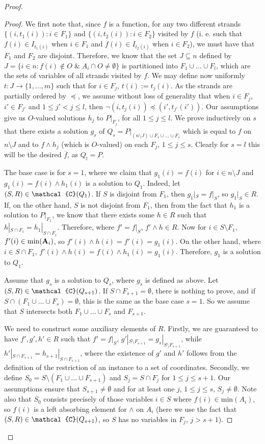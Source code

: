 \documentclass[10pt,a4paper]{amsart}
\newcommand{\m}[1]{{\uppercase {\mathbf {#1}}}}
\newcommand{\mt}{\wedge}
\newcommand{\usub}{\subseteq}
\newcommand{\vr}[1]{{\uppercase {\mathcal{#1}}}}
\begin{document}
\begin{proof}
\begin{proof}
We first note that, since $f$ is a function, for any two different strands $\{(i,t_1(i)):i\in F_1\}$ and $\{(i,t_2(i)):i\in F_2\}$ visited by $f$ (i. e. such that $f(i)\in I_{t_1(i)}$ when $i\in F_1$ and $f(i)\in I_{t_2(i)}$ when $i\in F_2$), we must have that $F_1$ and $F_2$ are disjoint. Therefore, we know that the set $J\usub n$ defined by $J=\{i\in n:f(i)\notin O\;\&\;A_i\cap O\neq\emptyset\}$ is partitioned into $F_1\cup\ldots\cup F_l$, which are the sets of variables of all strands visited by $f$. We may define now uniformly $t:J\rightarrow\{1,\ldots,m\}$ such that for $i\in F_j$, $t(i):=t_j(i)$. As the strands are partially ordered by $\preceq$, we assume without loss of generality that when $i\in F_j$, $i'\in F_{j'}$ and $1\leq j'<j\leq l$, then $\neg(i,t_j(i))\preceq(i',t_{j'}(i'))$. Our assumptions give us $O$-valued solutions $h_j$ to $P|_{F_j}$, for all $1\leq j\leq l$. We prove inductively on $s$ that there exists a solution $g_s$ of $Q_s=P|_{(n\setminus J)\cup F_1\cup\ldots\cup F_s}$ which is equal to $f$ on $n\setminus J$ and to $f\mt h_j$ (which is $O$-valued) on each $F_j$, $1\leq j\leq s$. Clearly for $s=l$ this will be the desired $\overline{f}$, as $Q_l=P$.

The base case is for $s=1$, where we claim that $g_1(i)=f(i)$ for $i\in n\setminus J$ and $g_1(i)=f(i)\mt h_1(i)$ is a solution to $Q_1$. Indeed, let $(S,R)\in\vr c(Q_1)$. If $S$ is disjoint from $F_1$, then $g_1|_S=f|_S$, so $g_1|_S\in R$. If, on the other hand, $S$ is not disjoint from $F_1$, then from the fact that $h_1$ is a solution to $P|_{F_1}$, we know that there exists some $h\in R$ such that $h|_{S\cap F_1}=h_1|_{S\cap F_1}$. Therefore, where $f'=f|_S$, $f'\mt h\in R$. Now for $i\in S\setminus F_1$, $f'(i)\in\mathrm{min}(\m A_i)$, so $f'(i)\mt h(i)=f'(i)=g_1(i)$. On the other hand, where $i\in S\cap F_1$, $f'(i)\mt h(i)=f(i)\mt h_1(i)=g_1(i)$. Therefore, $g_1$ is a solution to $Q_1$.

Assume that $g_s$ is a solution to $Q_s$, where $g_s$ is
defined as above. Let $(S,R)\in \vr c(Q_{s+1})$. If $S\cap F_{s+1}=\emptyset$, there is nothing to prove, and if $S\cap (F_1\cup\ldots\cup F_s)=\emptyset$, this is the same as the base case $s=1$. So we assume that $S$ intersects both $F_1\cup\ldots\cup F_s$ and $F_{s+1}$.

We need to construct some auxiliary elements of $R$. Firstly, we are guaranteed to have $f',g',h'\in R$ such that $f'=f|_S$, $g'|_{S\setminus F_{s+1}}=g_s|_{S\setminus F_{s+1}}$, while $h'|_{S\cap F_{s+1}}=h_{s+1}|_{S\cap F_{s+1}}$, where the existence of $g'$ and $h'$ follows from the definition of the restriction of an instance to a set of coordinates. Secondly, we define $S_0=S\setminus(F_1\cup\ldots\cup F_{s+1})$ and $S_j=S\cap F_j$ for $1\leq j\leq s+1$. Our assumptions ensure that $S_{s+1}\neq\emptyset$ and for at least one $j$, $1\leq j\leq s$, $S_j\neq\emptyset$. Note also that $S_0$ consists precisely of those variables $i\in S$ where $f(i)\in\mathrm{min}(A_i)$, so $f(i)$ is a left absorbing element for $\mt$ on $A_i$ (here we use the fact that $(S,R)\in \vr c(Q_{s+1})$, so $S$ has no variables in $F_j$, $j>s+1$).


\end{proof}
\end{proof}
\end{document}

